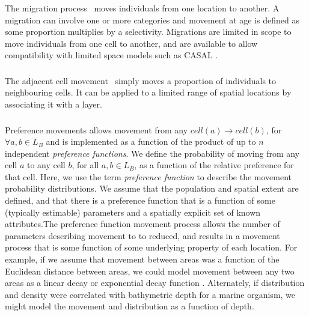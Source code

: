 \subsubsection{}

The migration process \NYI\ moves individuals from one location to another. A migration can involve one or more categories and movement at age is defined as some proportion multiplies by a selectivity. Migrations are limited in scope to move individuals from one cell to another, and are available to allow compatibility with limited space models such as CASAL \citep{1388}.

\subsubsection{}

The adjacent cell movement \NYI\ simply moves a proportion of individuals to neighbouring cells. It can be applied to a limited range of spatial locations by associating it with a layer.

\subsubsection{}

Preference movements allows movement from any $cell(a) \rightarrow cell(b)$, for $\forall a,b \in L_B$ and is implemented as a function of the product of up to $n$ independent \emph{preference functions}. We define the probability of moving from any cell $a$ to any cell $b$, for all $a,b \in L_B$, as a function of the relative preference for that cell. Here, we use the term \emph{preference function} \citep{1366,1367} to describe the movement probability distributions. We assume that the population and spatial extent are defined, and that there is a preference function that is a function of some (typically estimable) parameters and a spatially explicit set of known attributes.The preference function movement process allows the number of parameters describing movement to to reduced, and results in a movement process that is some function of some underlying property of each location. For example, if we assume that movement between areas was a function of the Euclidean distance between areas, we could model movement between any two areas as a linear decay or exponential decay function \citep{1366}. Alternately, if distribution and density were correlated with bathymetric depth for a marine organism, we might model the movement and distribution as a function of depth. 

